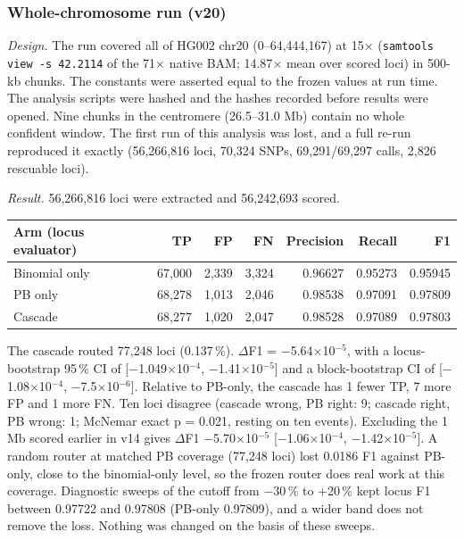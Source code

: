 \documentclass[11pt,a4paper]{article}
\makeatletter
\newcommand{\needspace}[1]{\par\ifdim\pagegoal=\maxdimen\else\dimen@=\pagegoal\advance\dimen@-\pagetotal\ifdim\dimen@<#1\relax\newpage\fi\fi}
\makeatother
\begin{document}
\needspace{5\baselineskip}
\subsubsection{\texorpdfstring{Whole-chromosome run (v20)}{Whole-chromosome run (v20)}}
\emph{Design.} The run covered all of HG002 chr20 (0--64,444,167) at 15$\times$ (\texttt{samtools view -s 42.\allowbreak{}2114} of the 71$\times$ native BAM; 14.87$\times$ mean over scored loci) in 500-kb chunks. The constants were asserted equal to the frozen values at run time. The analysis scripts were hashed and the hashes recorded before results were opened. Nine chunks in the centromere (26.5--31.0 Mb) contain no whole confident window. The first run of this analysis was lost, and a full re-run reproduced it exactly (56,266,816 loci, 70,324 SNPs, 69,291/69,297 calls, 2,826 rescuable loci).

\emph{Result.} 56,266,816 loci were extracted and 56,242,693 scored.

{\footnotesize
\setlength{\tabcolsep}{3.2pt}
\begin{xltabular}{\linewidth}{>{\hsize\raggedright\arraybackslash}Xrrrrrr}
\toprule
\textbf{Arm (locus evaluator)} & \textbf{TP} & \textbf{FP} & \textbf{FN} & \textbf{Precision} & \textbf{Recall} & \textbf{F1} \\
\midrule
\endhead
Binomial only & 67,000 & 2,339 & 3,324 & 0.96627 & 0.95273 & 0.95945 \\
PB only & 68,278 & 1,013 & 2,046 & 0.98538 & 0.97091 & 0.97809 \\
Cascade & 68,277 & 1,020 & 2,047 & 0.98528 & 0.97089 & 0.97803 \\
\bottomrule
\end{xltabular}
}

The cascade routed 77,248 loci (0.137\,\%). $\Delta$F1 = $-$5.64$\times$10$^{-5}$, with a locus-bootstrap 95\,\% CI of [$-$1.049$\times$10$^{-4}$, $-$1.41$\times$10$^{-5}$] and a block-bootstrap CI of [$-$1.08$\times$10$^{-4}$, $-$7.5$\times$10$^{-6}$]. Relative to PB-only, the cascade has 1 fewer TP, 7 more FP and 1 more FN. Ten loci disagree (cascade wrong, PB right: 9; cascade right, PB wrong: 1; McNemar exact p = 0.021, resting on ten events). Excluding the 1 Mb scored earlier in v14 gives $\Delta$F1 $-$5.70$\times$10$^{-5}$ [$-$1.06$\times$10$^{-4}$, $-$1.42$\times$10$^{-5}$]. A random router at matched PB coverage (77,248 loci) lost 0.0186 F1 against PB-only, close to the binomial-only level, so the frozen router does real work at this coverage. Diagnostic sweeps of the cutoff from $-$30\,\% to +20\,\% kept locus F1 between 0.97722 and 0.97808 (PB-only 0.97809), and a wider band does not remove the loss. Nothing was changed on the basis of these sweeps.
\end{document}
